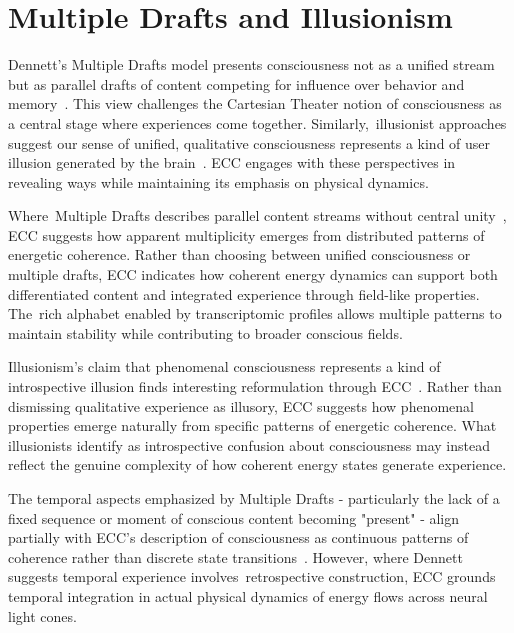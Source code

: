 \section{Multiple Drafts and Illusionism}

Dennett's Multiple Drafts model presents consciousness not as a unified stream but as parallel drafts of content competing for influence over behavior and memory~\cite{Dennett1991, Dennett1992}. This view challenges the Cartesian Theater notion of consciousness as a central stage where experiences come together. Similarly,~illusionist approaches suggest our sense of unified, qualitative consciousness represents a kind of user illusion generated by the brain~\cite{Dennett2016, Frankish2016}. ECC engages with these perspectives in revealing ways while maintaining its emphasis on physical dynamics.

Where~Multiple Drafts describes parallel content streams without central unity~\cite{Dennett1992, Blackmore2002}, ECC suggests how apparent multiplicity emerges from distributed patterns of energetic coherence. Rather than choosing between unified consciousness or multiple drafts, ECC indicates how coherent energy dynamics can support both differentiated content and integrated experience through field-like properties. The~rich alphabet enabled by transcriptomic profiles allows multiple patterns to maintain stability while contributing to broader conscious fields.

Illusionism's claim that phenomenal consciousness represents a kind of introspective illusion finds interesting reformulation through ECC~\cite{Frankish2016, Frankish2019}. Rather than dismissing qualitative experience as illusory, ECC suggests how phenomenal properties emerge naturally from specific patterns of energetic coherence. What illusionists identify as introspective confusion about consciousness may instead reflect the genuine complexity of how coherent energy states generate experience.

The temporal aspects emphasized by Multiple Drafts - particularly the lack of a fixed sequence or moment of conscious content becoming "present" - align partially with ECC's description of consciousness as continuous patterns of coherence rather than discrete state transitions~\cite{Blackmore2002, Dennett1992}. However, where Dennett suggests temporal experience involves~retrospective construction, ECC grounds temporal integration in actual physical dynamics of energy flows across neural light cones.


